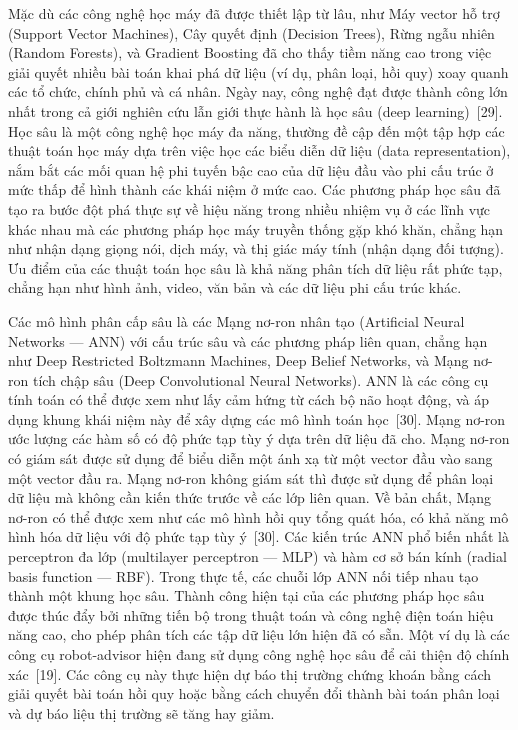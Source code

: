 Mặc dù các công nghệ học máy đã được thiết lập từ lâu, như Máy vector hỗ trợ (Support Vector Machines), Cây quyết định (Decision Trees), Rừng ngẫu nhiên (Random Forests), và Gradient Boosting đã cho thấy tiềm năng cao trong việc giải quyết nhiều bài toán khai phá dữ liệu (ví dụ, phân loại, hồi quy) xoay quanh các tổ chức, chính phủ và cá nhân. Ngày nay, công nghệ đạt được thành công lớn nhất trong cả giới nghiên cứu lẫn giới thực hành là học sâu (deep learning)~[29]. Học sâu là một công nghệ học máy đa năng, thường đề cập đến một tập hợp các thuật toán học máy dựa trên việc học các biểu diễn dữ liệu (data representation), nắm bắt các mối quan hệ phi tuyến bậc cao của dữ liệu đầu vào phi cấu trúc ở mức thấp để hình thành các khái niệm ở mức cao. Các phương pháp học sâu đã tạo ra bước đột phá thực sự về hiệu năng trong nhiều nhiệm vụ ở các lĩnh vực khác nhau mà các phương pháp học máy truyền thống gặp khó khăn, chẳng hạn như nhận dạng giọng nói, dịch máy, và thị giác máy tính (nhận dạng đối tượng). Ưu điểm của các thuật toán học sâu là khả năng phân tích dữ liệu rất phức tạp, chẳng hạn như hình ảnh, video, văn bản và các dữ liệu phi cấu trúc khác.

Các mô hình phân cấp sâu là các Mạng nơ-ron nhân tạo (Artificial Neural Networks — ANN) với cấu trúc sâu và các phương pháp liên quan, chẳng hạn như Deep Restricted Boltzmann Machines, Deep Belief Networks, và Mạng nơ-ron tích chập sâu (Deep Convolutional Neural Networks). ANN là các công cụ tính toán có thể được xem như lấy cảm hứng từ cách bộ não hoạt động, và áp dụng khung khái niệm này để xây dựng các mô hình toán học~[30]. Mạng nơ-ron ước lượng các hàm số có độ phức tạp tùy ý dựa trên dữ liệu đã cho. Mạng nơ-ron có giám sát được sử dụng để biểu diễn một ánh xạ từ một vector đầu vào sang một vector đầu ra. Mạng nơ-ron không giám sát thì được sử dụng để phân loại dữ liệu mà không cần kiến thức trước về các lớp liên quan. Về bản chất, Mạng nơ-ron có thể được xem như các mô hình hồi quy tổng quát hóa, có khả năng mô hình hóa dữ liệu với độ phức tạp tùy ý~[30]. Các kiến trúc ANN phổ biến nhất là perceptron đa lớp (multilayer perceptron — MLP) và hàm cơ sở bán kính (radial basis function — RBF). Trong thực tế, các chuỗi lớp ANN nối tiếp nhau tạo thành một khung học sâu. Thành công hiện tại của các phương pháp học sâu được thúc đẩy bởi những tiến bộ trong thuật toán và công nghệ điện toán hiệu năng cao, cho phép phân tích các tập dữ liệu lớn hiện đã có sẵn. Một ví dụ là các công cụ robot-advisor hiện đang sử dụng công nghệ học sâu để cải thiện độ chính xác~[19]. Các công cụ này thực hiện dự báo thị trường chứng khoán bằng cách giải quyết bài toán hồi quy hoặc bằng cách chuyển đổi thành bài toán phân loại và dự báo liệu thị trường sẽ tăng hay giảm.

